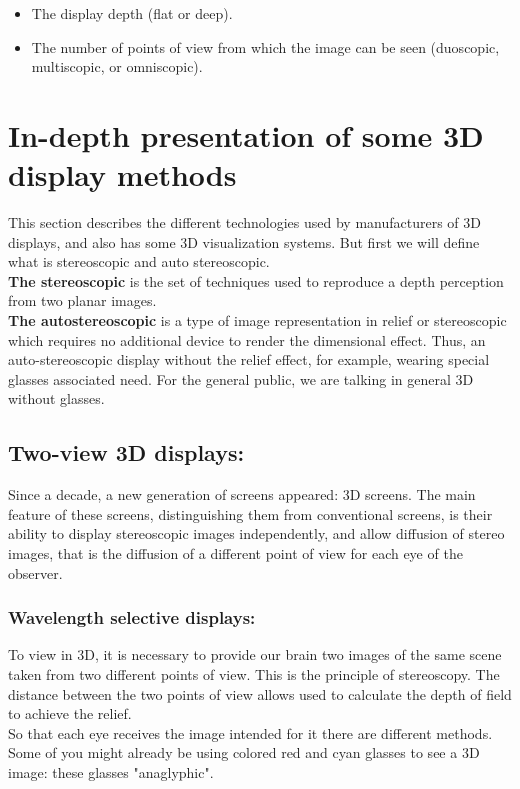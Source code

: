 \begin{itemize}
\item The display depth (flat or deep).
\item The number of points of view from which the image can be seen (duoscopic, multiscopic, or omniscopic).
\end{itemize}

\section{In-depth presentation of some 3D display methods}
This section describes the different technologies used by manufacturers of 3D displays, and also has some 3D visualization systems. But first we will define what is stereoscopic and auto stereoscopic.\\
\textbf{The stereoscopic} is the set of techniques used to reproduce a depth perception from two planar images.\\
\textbf{The autostereoscopic} is a type of image representation in relief or stereoscopic which requires no additional device to render the dimensional effect. Thus, an auto-stereoscopic display without the relief effect, for example, wearing special glasses associated need. For the general public, we are talking in general 3D without glasses.

\subsection{Two-view 3D displays:}
Since a decade, a new generation of screens appeared: 3D screens. The main feature of these screens, distinguishing them from conventional screens, is their ability to display stereoscopic images independently, and allow diffusion of stereo images, that is the diffusion of a different point of view for each eye of the observer.
\subsubsection{Wavelength selective displays:}
To view in 3D, it is necessary to provide our brain two images of the same scene taken from two different points of view. This is the principle of stereoscopy. The distance between the two points of view allows used to calculate the depth of field to achieve the relief.\\
So that each eye receives the image intended for it there are different methods. Some of you might already be using colored red and cyan glasses to see a 3D image: these glasses "anaglyphic".

